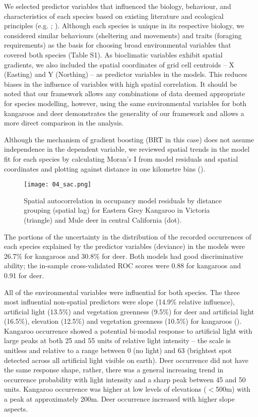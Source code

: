 We selected predictor variables that influenced the biology, behaviour, and characteristics of each species based on existing literature and ecological principles (e.g. \cite{coul10}; \cite{ferg05}). Although each species is unique in its respective biology, we considered similar behaviours (sheltering and movements) and traits (foraging requirements) as the basis for choosing broad environmental variables that covered both species (Table S1).  As bioclimatic variables exhibit spatial gradients, we also included the spatial coordinates of grid cell centroids -- X (Easting) and Y (Northing) -- as predictor variables in the models.  This reduces biases in the influence of variables with high spatial correlation.  It should be noted that our framework allows any combinations of data deemed appropriate for species modelling, however, using the same environmental variables for both kangaroos and deer demonstrates the generality of our framework and allows a more direct comparison in the analysis.

Although the mechanism of gradient boosting (BRT in this case) does not assume independence in the dependent variable, we reviewed spatial trends in the model fit for each species by calculating Moran’s I from model residuals and spatial coordinates and plotting against distance in one kilometre bins ().

\begin{figure*}[htp]
  \centering
  \texttt{[image: 04\_sac.png]}
  \caption[Spatial autocorrelation in occupancy model residuals for kangaroos and deer]{Spatial autocorrelation in occupancy model residuals by distance grouping (spatial lag) for Eastern Grey Kangaroo in Victoria (triangle) and Mule deer in central California (dot).}
  \label{cal_sac_occ}
\end{figure*}

The portions of the uncertainty in the distribution of the recorded occurrences of each species explained by the predictor variables (deviance) in the models were 26.7\% for kangaroos and 30.8\% for deer. Both models had good discriminative ability; the in-sample cross-validated ROC scores were 0.88 for kangaroos and 0.91 for deer.

All of the environmental variables were influential for both species. The three most influential non-spatial predictors were slope (14.9\% relative influence), artificial light (13.5\%) and vegetation greenness (9.5\%) for deer and artificial light (16.5\%), elevation (12.5\%) and vegetation greenness (10.5\%) for kangaroos ().  Kangaroo occurrence showed a potential bi-modal response to artificial light with large peaks at both 25 and 55 units of relative light intensity -- the scale is unitless and relative to a range between 0 (no light) and 63 (brightest spot detected across all artificial light visible on earth).  Deer occurrence did not have the same response shape, rather, there was a general increasing trend in occurrence probability with light intensity and a sharp peak between 45 and 50 units. Kangaroo occurrence was higher at low levels of elevations ($<$500m) with a peak at approximately 200m.  Deer occurrence increased with higher slope aspects.

